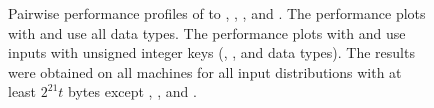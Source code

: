 \begin{figure}[tbp]
  \caption{Pairwise performance profiles of \compiparassssort to
    \compppbbs, \comppbalancedsort, \radixregion, and
    \compiparassrsort. The performance plots with \compppbbs and
    \comppbalancedsort use all data types. The performance plots with
    \radixregion and \compiparassrsort use inputs with
    unsigned integer keys (\uint, \ulong, and \pair data types). The
    results were obtained on all machines for all input distributions
    with at least $2^{21}t$ bytes except \distsorted,
    \distreversesorted, and \distones.}\label{fig:perf par}
\end{figure}

